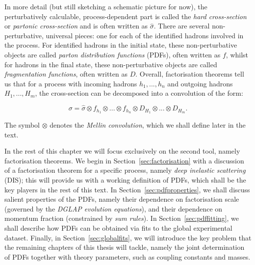 \documentclass[withindex,glossary]{cam-thesis}
\begin{document}
\begin{enumerate}[label = (\arabic*)]
In more detail (but still sketching a schematic picture for now), the perturbatively calculable, process-dependent part is called the \textit{hard cross-section} or \textit{partonic cross-section} and is often written as $\hat{\sigma}$. There are several non-perturbative, universal pieces: one for each of the identified hadrons involved in the process. For identified hadrons in the initial state, these non-perturbative objects are called \textit{parton distribution functions} (PDFs), often written as $f$, whilst for hadrons in the final state, these non-perturbative objects are called \textit{fragmentation functions}, often written as $D$. Overall, factorisation theorems tell us that for a process with incoming hadrons $h_1, ..., h_n$ and outgoing hadrons $H_1,..., H_m$, the cross-section can be decomposed into a convolution of the form:

\begin{equation}
\label{eq:generic_factorisation_theorem}
\sigma = \hat{\sigma} \otimes f_{h_1} \otimes ... \otimes f_{h_n} \otimes D_{H_1} \otimes ... \otimes D_{H_m}.
\end{equation}

The symbol $\otimes$ denotes the \textit{Mellin convolution}, which we shall define later in the text. 

\end{enumerate}

In the rest of this chapter we will focus exclusively on the second tool, namely factorisation theorems. We begin in Section~\ref{sec:factorisation} with a discussion of a factorisation theorem for a specific process, namely \textit{deep inelastic scattering} (DIS); this will provide us with a working definition of PDFs, which shall be the key players in the rest of this text. In Section~\ref{sec:pdfproperties}, we shall discuss salient properties of the PDFs, namely their dependence on factorisation scale (governed by the \textit{DGLAP evolution equations}), and their dependence on momentum fraction (constrained by \textit{sum rules}). In Section~\ref{sec:pdffitting}, we shall describe how PDFs can be obtained via fits to the global experimental dataset. Finally, in Section~\ref{sec:globalfits}, we will introduce the key problem that the remaining chapters of this thesis will tackle, namely the joint determination of PDFs together with theory parameters, such as coupling constants and masses.



%
%
 
\end{document}
